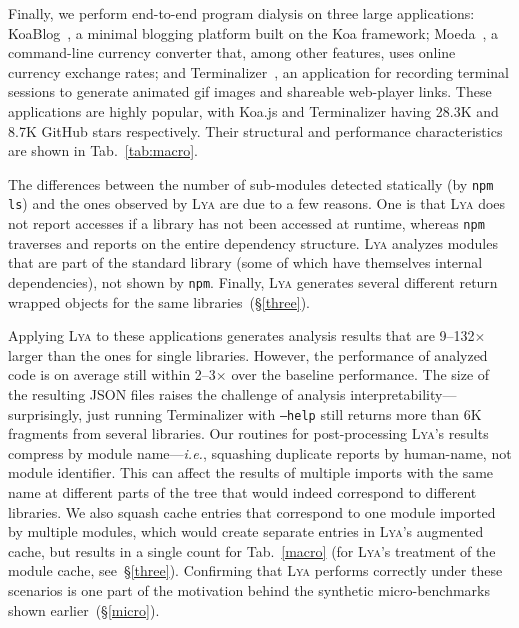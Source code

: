 \documentclass[letterpaper,twocolumn,10pt]{article}
\def\ie{{\em i.e.}, }
\newcommand{\ttt}[1]{\texttt{#1}}
\newcommand{\sx}[1]{(\S\ref{#1})}
\newcommand{\sys}{{\scshape Lya}\xspace}
\begin{document}
Finally, we perform end-to-end program dialysis on three large applications:
  KoaBlog~\cite{koa}, a minimal blogging platform built on the Koa framework;
  Moeda~\cite{moeda}, a command-line currency converter that, among other features, uses online currency exchange rates; and
  Terminalizer~\cite{terminalizer}, an application for recording terminal sessions to generate animated gif images and shareable web-player links.
These applications are highly popular, with Koa.js and Terminalizer having 28.3K and 8.7K GitHub stars respectively.
Their structural and performance characteristics are shown in Tab.~\ref{tab:macro}.

The differences between the number of sub-modules detected statically (by \ttt{npm ls}) and the ones observed by \sys are due to a few reasons.
One is that \sys does not report accesses if a library has not been accessed at runtime, whereas \ttt{npm} traverses and reports on the entire dependency structure.
\sys analyzes modules that are part of the standard library (some of which have themselves internal dependencies),  not shown by \ttt{npm}.
Finally, \sys generates several different return wrapped objects for the same libraries~\sx{three}.

Applying \sys to these applications generates analysis results that are 9--132$\times$ larger than the ones for single libraries.
However, the performance of analyzed code is on average still within 2--3$\times$ over the baseline performance.
The size of the resulting JSON files raises the challenge of analysis interpretability---surprisingly, just running Terminalizer with \ttt{--help} still returns more than 6K fragments from several libraries.
Our routines for post-processing \sys's results compress by module name---\ie squashing duplicate reports by human-name, not module identifier.
This can affect the results of multiple imports with the same name at different parts of the tree that would indeed correspond to different libraries.
We also squash cache entries that correspond to one module imported by multiple modules, which would create separate entries in \sys's augmented cache, but results in a single count for Tab.~\ref{macro} (for \sys's treatment of the module cache, see~\S\ref{three}).
Confirming that \sys performs correctly under these scenarios is one part of the motivation behind the synthetic micro-benchmarks shown earlier~\sx{micro}.
\end{document}
